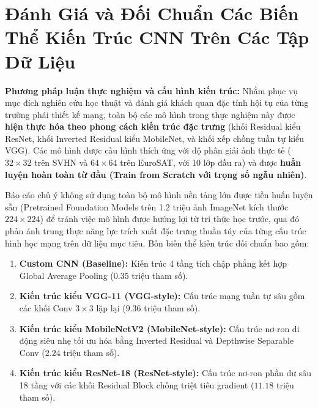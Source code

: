 \documentclass[12pt,a4paper]{report}
\begin{document}
\section{Đánh Giá và Đối Chuẩn Các Biến Thể Kiến Trúc CNN Trên Các Tập Dữ Liệu}

\noindent \textbf{Phương pháp luận thực nghiệm và cấu hình kiến trúc:}
Nhằm phục vụ mục đích nghiên cứu học thuật và đánh giá khách quan đặc tính hội tụ của từng trường phái thiết kế mạng, toàn bộ các mô hình trong thực nghiệm này được \textbf{hiện thực hóa theo phong cách kiến trúc đặc trưng} (khối Residual kiểu ResNet, khối Inverted Residual kiểu MobileNet, và khối xếp chồng tuần tự kiểu VGG). Các mô hình được cấu hình thích ứng với độ phân giải ảnh thực tế ($32 \times 32$ trên SVHN và $64 \times 64$ trên EuroSAT, với 10 lớp đầu ra) và được \textbf{huấn luyện hoàn toàn từ đầu (Train from Scratch với trọng số ngẫu nhiên)}.

Báo cáo chủ ý không sử dụng toàn bộ mô hình nền tảng lớn được tiền huấn luyện sẵn (Pretrained Foundation Models trên 1.2 triệu ảnh ImageNet kích thước $224 \times 224$) để tránh việc mô hình được hưởng lợi từ tri thức học trước, qua đó phản ánh trung thực năng lực trích xuất đặc trưng thuần túy của từng cấu trúc hình học mạng trên dữ liệu mục tiêu. Bốn biến thể kiến trúc đối chuẩn bao gồm:
\begin{enumerate}[leftmargin=1.2cm]
    \item \textbf{Custom CNN (Baseline):} Kiến trúc 4 tầng tích chập phẳng kết hợp Global Average Pooling ($0.35$ triệu tham số).
    \item \textbf{Kiến trúc kiểu VGG-11 (VGG-style):} Cấu trúc mạng tuần tự sâu gồm các khối Conv $3 \times 3$ lặp lại ($9.36$ triệu tham số).
    \item \textbf{Kiến trúc kiểu MobileNetV2 (MobileNet-style):} Cấu trúc nơ-ron di động siêu nhẹ tối ưu hóa bằng Inverted Residual và Depthwise Separable Conv ($2.24$ triệu tham số).
    \item \textbf{Kiến trúc kiểu ResNet-18 (ResNet-style):} Cấu trúc nơ-ron phần dư sâu 18 tầng với các khối Residual Block chống triệt tiêu gradient ($11.18$ triệu tham số).
\end{enumerate}
\end{document}

